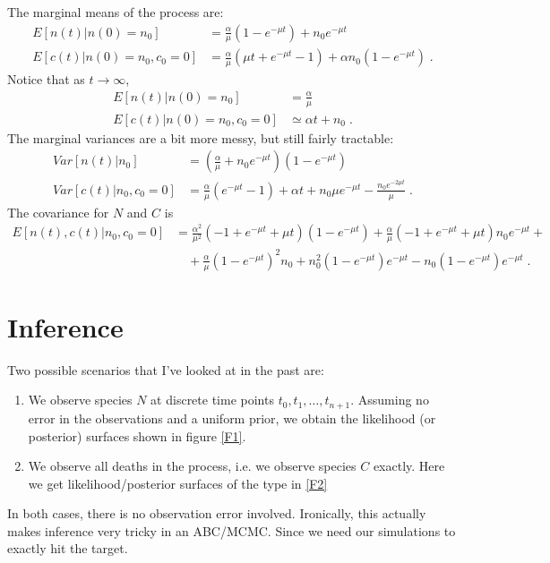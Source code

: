 \documentclass[11pt,BCOR2mm,DIV14]{scrartcl}
\begin{document}
The marginal means of the process are:
\begin{align*}
E[n(t) | n(0) = n_0 ] &= \frac{\alpha}{\mu}(1-e^{-\mu t}) + n_0 e^{-\mu t} \\
E[c(t) | n(0) = n_0, c_0=0] &= \frac{\alpha}{\mu} (\mu t + e^{-\mu t} - 1) + \alpha n_0(1-e^{-\mu t}) \;.
\end{align*}
Notice that as $t \rightarrow \infty$,
\begin{align*}
E[n(t) | n(0) = n_0 ] &= \frac{\alpha}{\mu}\\
E[c(t) | n(0) = n_0, c_0=0] &\simeq \alpha t + n_0 \;.
\end{align*}
The marginal variances are a bit more messy, but still fairly tractable:
\begin{align*}
Var[n(t) | n_0]  &= \left(\frac{\alpha}{\mu} + n_0e^{-\mu t}\right)(1-e^{-\mu t})\\
Var[c(t) | n_0, c_0=0]  &= \frac{\alpha}{\mu}(e^{-\mu t} - 1) + \alpha t + n_0 \mu e^{-\mu t} - \frac{n_0 e^{-2\mu t}}{\mu} \;. 
\end{align*}
The covariance for $N$ and $C$ is
\begin{align*}
E[n(t), c(t)| n_0, c_0=0] &= \frac{\alpha^2}{\mu^2}(-1+e^{-\mu t}+\mu t)(1-e^{-\mu t}) + 
\frac{\alpha}{\mu} (-1+e^{-\mu t}+\mu t) n_0 e^{-\mu t} + \\
&\quad +\frac{\alpha}{\mu} (1-e^{-\mu t})^2 n_0 + 
n_0^2  (1-e^{-\mu t})e^{-\mu t}
- n_0(1-e^{-\mu t})e^{-\mu t}\;.
\end{align*}


\section*{Inference}

Two possible scenarios that I've looked at in the past are:
\begin{enumerate}
\item We observe species $N$ at discrete time points $t_0, t_1, \ldots, t_{n+1}$. Assuming no error in the observations and a uniform prior, we obtain the likelihood (or posterior) surfaces shown in figure \ref{F1}.
\item We observe all deaths in the process, i.e. we observe species $C$ exactly. Here we get likelihood/posterior surfaces of the type in \ref{F2}
\end{enumerate}
In both cases, there is no observation error involved. Ironically, this actually makes inference very tricky in an ABC/MCMC. Since we need our simulations to exactly hit the target.
\end{document}
